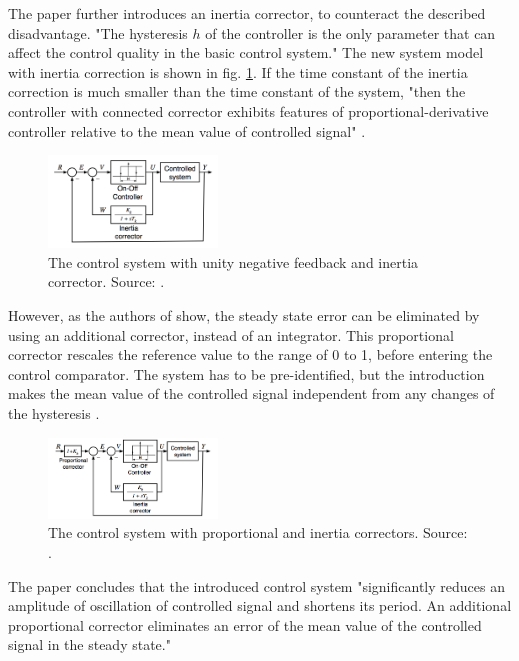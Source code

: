 The paper \cite{article:onoffPLC} further introduces an inertia corrector, to counteract the described disadvantage. "The hysteresis \(h\) of the controller is the only parameter that can affect the control quality in the basic control system." The new system model with inertia correction is shown in fig. \ref{fig:inertiaCorrection}. If the time constant of the inertia correction is much smaller than the time constant of the system, "then the controller with connected corrector exhibits features of proportional-derivative controller relative to the mean value of controlled signal" \cite{article:onoffPLC}.

\begin{figure}[H]
\centering          
\includegraphics[width=0.4\textwidth]{./fig/inertiaCorrection} \caption[The control system with unity negative feedback and inertia corrector.]{The control system with unity negative feedback and inertia corrector. Source: \cite{article:onoffPLC}.} 
\label{fig:inertiaCorrection}
\end{figure}  

However, as the authors of \cite{article:onoffPLC} show, the steady state error can be eliminated by using an additional corrector, instead of an integrator. This proportional corrector rescales the reference value to the range of 0 to 1, before entering the control comparator. The system has to be pre-identified, but the introduction makes the mean value of the controlled signal independent from any changes of the hysteresis \cite{article:onoffPLC}.

\begin{figure}[H]
\centering          
\includegraphics[width=0.4\textwidth]{./fig/inertiaCorrectionProp} \caption[The control system with proportional and inertia correctors.]{The control system with proportional and inertia correctors. Source: \cite{article:onoffPLC}.} 
\label{fig:inertiaCorrectionProp}
\end{figure} 

The paper \cite{article:onoffPLC} concludes that the introduced control system "significantly reduces an amplitude of oscillation of controlled signal and shortens its period. An additional proportional corrector eliminates an error of the mean value of the controlled signal in the steady state."